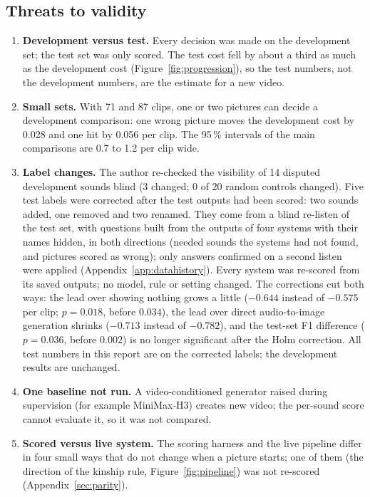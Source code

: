 \subsection{Threats to validity}
\begin{enumerate}[label=\textbf{T\arabic*.}, leftmargin=*]
  \item \textbf{Development versus test.} Every decision was made on the development set; the test set was only
        scored. The test cost fell by about a third as much as the development cost (Figure~\ref{fig:progression}), so
        the test numbers, not the development numbers, are the estimate for a new video.
  \item \textbf{Small sets.} With 71 and 87 clips, one or two pictures can decide a development comparison: one wrong
        picture moves the development cost by 0.028 and one hit by 0.056 per clip. The 95\,\% intervals of the main comparisons are 0.7 to 1.2 per clip wide.
  \item \textbf{Label changes.} The author re-checked the visibility of 14 disputed development sounds blind (3 changed;
        0 of 20 random controls changed). Five test labels were corrected after the test outputs had been scored: two
        sounds added, one removed and two renamed. They come from a blind re-listen of the test set, with questions built from the
        outputs of four systems with their names hidden, in both directions (needed sounds the systems had not found,
        and pictures scored as wrong); only answers confirmed on a second listen were applied
        (Appendix~\ref{app:datahistory}). Every system was re-scored from
        its saved outputs; no model, rule or setting changed. The corrections cut both ways: the lead over showing
        nothing grows a little ($-0.644$ instead of $-0.575$ per clip; $p = 0.018$, before $0.034$), the lead over direct audio-to-image generation
        shrinks ($-0.713$ instead of $-0.782$), and the test-set F1 difference ($p = 0.036$, before $0.002$) is no
        longer significant after the Holm correction. All test numbers in this report are on the corrected labels; the
        development results are unchanged.
  \item \textbf{One baseline not run.} A video-conditioned generator raised during supervision (for example
        MiniMax-H3) creates new video; the per-sound score cannot evaluate it, so it was not compared.
  \item \textbf{Scored versus live system.} The scoring harness and the live pipeline differ in four small ways that do
        not change when a picture starts; one of them (the direction of the kinship rule, Figure~\ref{fig:pipeline}) was not re-scored
        (Appendix~\ref{sec:parity}).
\end{enumerate}

